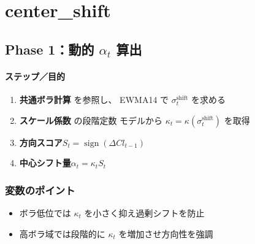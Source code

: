 
\section*{center\_shift}\nopagebreak[4]

\subsection*{Phase 1：動的 $\alpha_t$ 算出}\nopagebreak[4]
\paragraph{ステップ／目的}
\begin{flushleft}
\begin{enumerate}
  \item \textbf{共通ボラ計算} を参照し、
        EWMA14 で \(\sigma_t^{\text{shift}}\) を求める
  \item \textbf{スケール係数} の段階定数
        モデルから \(\kappa_t=\kappa(\sigma_t^{\text{shift}})\) を取得
  \item \textbf{方向スコア}\;\(S_t=\operatorname{sign}(\Delta Cl_{t-1})\)
  \item \textbf{中心シフト量}\;\(\alpha_t=\kappa_t S_t\)
\end{enumerate}
\end{flushleft}

\subsubsection*{変数のポイント}
\begin{flushleft}
\begin{itemize}
  \item ボラ低位では \(\kappa_t\) を小さく抑え過剰シフトを防止
  \item 高ボラ域では段階的に \(\kappa_t\) を増加させ方向性を強調
\end{itemize}
\end{flushleft}

